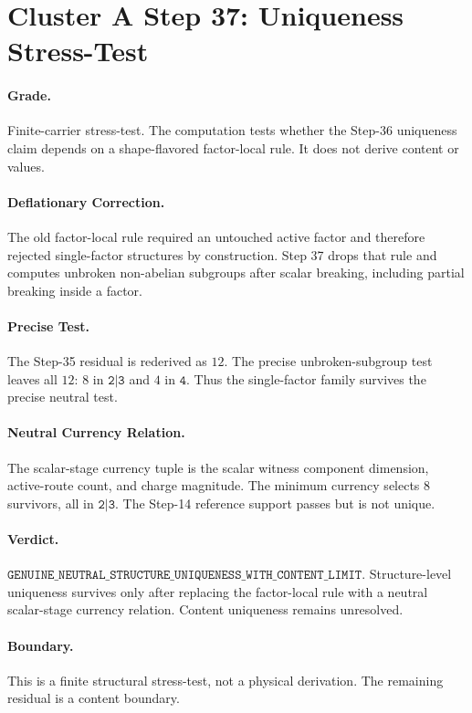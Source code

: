 \section*{Cluster A Step 37: Uniqueness Stress-Test}

\paragraph{Grade.}
Finite-carrier stress-test. The computation tests whether the Step-36 uniqueness claim depends on a shape-flavored factor-local rule. It does not derive content or values.

\paragraph{Deflationary Correction.}
The old factor-local rule required an untouched active factor and therefore rejected single-factor structures by construction. Step 37 drops that rule and computes unbroken non-abelian subgroups after scalar breaking, including partial breaking inside a factor.

\paragraph{Precise Test.}
The Step-35 residual is rederived as \(12\). The precise unbroken-subgroup test leaves all \(12\): \(8\) in \(\texttt{2|3}\) and \(4\) in \(\texttt{4}\). Thus the single-factor family survives the precise neutral test.

\paragraph{Neutral Currency Relation.}
The scalar-stage currency tuple is the scalar witness component dimension, active-route count, and charge magnitude. The minimum currency selects \(8\) survivors, all in \(\texttt{2|3}\). The Step-14 reference support passes but is not unique.

\paragraph{Verdict.}
\(\texttt{GENUINE\_NEUTRAL\_STRUCTURE\_UNIQUENESS\_WITH\_CONTENT\_LIMIT}\). Structure-level uniqueness survives only after replacing the factor-local rule with a neutral scalar-stage currency relation. Content uniqueness remains unresolved.

\paragraph{Boundary.}
This is a finite structural stress-test, not a physical derivation. The remaining residual is a content boundary.
